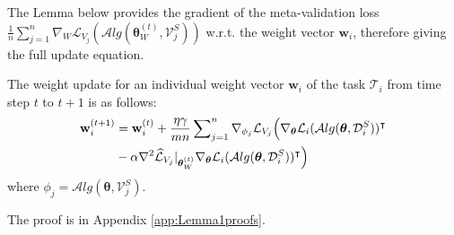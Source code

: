 The Lemma below provides the gradient of the meta-validation loss $\frac{1}{n} \sum_{j=1}^{n}\nabla_{W}\mathcal{L}_{V_j}(\mathcal{A}lg(\boldsymbol{\theta}^{(t)}_{W},\mathcal{V}_j^{S}))$ w.r.t. the weight vector $\mathbf{w}_{i}$, therefore giving the full update equation.%
\begin{lemma}
\label{weight-update-lemma} 
The weight update for an individual weight vector $\mathbf{w}_{i}$ of the task $\mathcal{T}_i$ from time step $t$ to  $t+1$ is as follows:
\begin{align}
\small
\label{weight-update}
    \mathbf{w}_i^{(t+1)}&=\mathbf{w}_i^{(t)} + \frac{\eta \gamma}{mn} \sum\nolimits_{j=1}^{n} \nabla_{\phi_j} \mathcal{L}_{V_j}  \Big(\nabla_{\boldsymbol{\theta}}\mathcal{L}_i(\mathcal{A}lg(\boldsymbol{\theta}, \mathcal{D}_i^S))^{\intercal} \nonumber\\
    &- \alpha  \nabla^2\widehat{\mathcal{L}}_{V_j}|_{\boldsymbol{\theta}_{W}^{(t)}} \nabla_{\boldsymbol{\theta}}\mathcal{L}_i(\mathcal{A}lg(\boldsymbol{\theta}, \mathcal{D}_i^S))^{\intercal} \Big) 
\end{align}
where $\phi_j=\mathcal{A}lg(\boldsymbol{\theta}, \mathcal{V}_{j}^{S})$.
\end{lemma}
The proof is in Appendix \ref{app:Lemma1proofs}.
